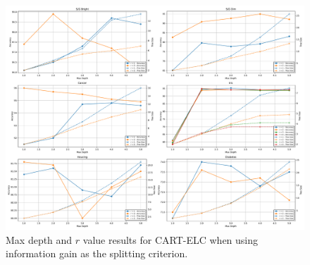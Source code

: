 \documentclass[10pt]{article} %
\begin{document}
\begin{figure}[h]
\includegraphics[width=\linewidth]{ig.pdf}
	\caption{Max depth and $r$ value results for CART-ELC when using information gain as the splitting criterion.}
\label{graph_ig}
\end{figure}
\end{document}
